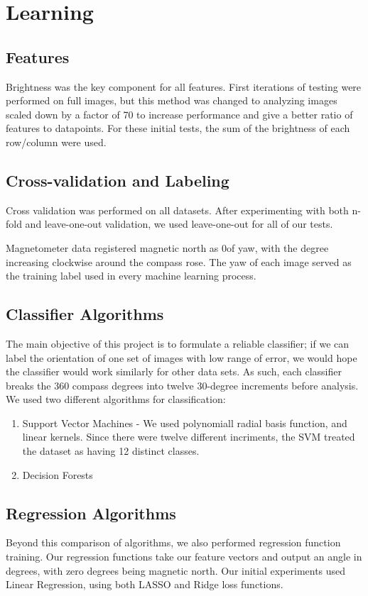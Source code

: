 \documentclass{article}
\begin{document}
\section{Learning}

\subsection{Features}
Brightness was the key component for all features. First iterations of testing were performed on full images, but this method was changed to analyzing images scaled down by a factor of 70 to increase performance and give a better ratio of features to datapoints. For these initial tests, the sum of the brightness of each row/column were used. 

\subsection{Cross-validation and Labeling}
Cross validation was performed on all datasets. After experimenting with both n-fold and leave-one-out validation, we used leave-one-out for all of our tests. 

Magnetometer data registered magnetic north as 0\degrees of yaw, with the degree increasing clockwise around the compass rose. The yaw of each image served as the training label used in every machine learning process.

\subsection{Classifier Algorithms}
The main objective of this project is to formulate a reliable classifier; if we can label the orientation of one set of images with low range of error, we would hope the classifier would work similarly for other data sets. As such, each classifier breaks the 360 compass degrees into twelve 30-degree increments before analysis. We used two different algorithms for classification: 
\begin{enumerate}[1.]
\item Support Vector Machines - We used polynomiall radial basis function, and linear kernels. Since there were twelve different incriments, the SVM treated the dataset as having 12 distinct classes. 
\item Decision Forests
\end{enumerate}

\subsection{Regression Algorithms}
Beyond this comparison of algorithms, we also performed regression function training. Our regression functions take our feature vectors and output an angle in degrees, with zero degrees being magnetic north. Our initial experiments used Linear Regression, using both LASSO and Ridge loss functions. 
\end{document}
